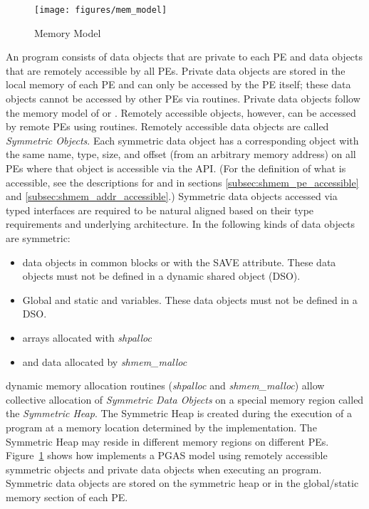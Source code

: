 \begin{figure}[h]
\texttt{[image: figures/mem\_model]}      
\caption{\OSH Memory Model}                                   
\label{fig:mem_model}                                               
\end{figure}      
%
An \openshmem program consists of data objects that are private to each \ac{PE}
and data  objects that are remotely accessible by all \ac{PE}s. Private data
objects are stored in the local memory of each \ac{PE} and can only be accessed
by the \ac{PE} itself; these data objects cannot be accessed by other \ac{PE}s
via \openshmem routines. Private data objects follow the memory model of
\Clang or \Fortran. Remotely accessible objects, however, can be accessed by
remote \ac{PE}s using \openshmem routines.  Remotely accessible data objects are
called \emph{Symmetric Objects}.  Each symmetric data object has a corresponding
object with the same name, type, size, and offset (from an arbitrary memory
address) on all PEs where that object is accessible via the \openshmem \ac{API}.
(For the definition of what is accessible, see the descriptions for
 and  in sections
\ref{subsec:shmem_pe_accessible} and \ref{subsec:shmem_addr_accessible}.)
Symmetric data objects accessed via typed \openshmem interfaces are required to
be natural aligned based on their type requirements and underlying architecture.
In \openshmem the following kinds of data objects are symmetric:
%
\begin{itemize}
  \item \Fortran data objects in common blocks or with the  SAVE  attribute.
      These data objects must not be defined in a dynamic shared object (DSO).
  \item Global and static \Clang and \Cpp variables. These data objects must
      not  be defined in a DSO.
  \item \Fortran arrays allocated with \textit{shpalloc} 
  \item \Clang and \Cpp data allocated by \textit{shmem\_malloc}
\end{itemize}       

\openshmem dynamic memory allocation routines (\textit{shpalloc} and
\textit{shmem\_malloc}) allow collective allocation of \emph{Symmetric Data
Objects} on a special memory region called the \emph{Symmetric Heap}. The
Symmetric Heap is created during the execution of a program at a memory location
determined by the implementation. The Symmetric Heap may reside in different
memory regions on different \acp{PE}. Figure~\ref{fig:mem_model} shows how
\openshmem implements a \ac{PGAS} model using remotely accessible symmetric
objects and private data objects when executing an \openshmem program.
Symmetric data objects are stored on the symmetric heap or in the global/static
memory section of each \ac{PE}. 

